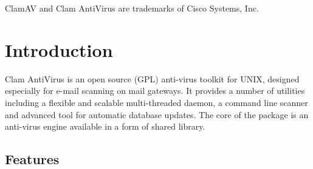 \documentclass[a4paper,titlepage,12pt]{article}
\begin{document}
    \vspace{0.3cm}
    \noindent
    \begin{boxedminipage}[b]{\textwidth}
    ClamAV and Clam AntiVirus are trademarks of Cisco Systems, Inc.
    \end{boxedminipage}

    \newpage

    \section{Introduction}
    Clam AntiVirus is an open source (GPL) anti-virus toolkit for UNIX,
    designed especially for e-mail scanning on mail gateways. It provides
    a number of utilities including a flexible and scalable multi-threaded
    daemon, a command line scanner and advanced tool for automatic database
    updates. The core of the package is an anti-virus engine available in a
    form of shared library.

    \subsection{Features}
\end{document}
